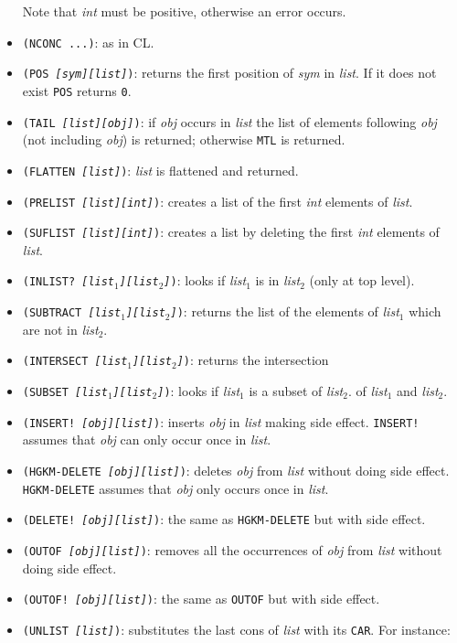 \begin{itemize}
        Note that {\it int} must be positive, otherwise an error occurs.
    \item {\tt (NCONC ...)}:
         as in CL.
    \item {\tt  (POS {\it [sym][list]})}:
        returns the first position of {\it sym} in {\it list}.
        If it does not exist {\tt POS} returns {\tt 0}.
    \item {\tt  (TAIL {\it [list][obj]})}:
        if {\it obj} occurs in {\it list} the list of elements following
        {\it obj} (not including {\it obj}) is returned; otherwise {\tt MTL}
        is returned. 
    \item {\tt  (FLATTEN {\it [list]})}:
        {\it list} is flattened and returned.
    \item {\tt  (PRELIST {\it [list][int]})}:
        creates a list of the first {\it int} elements of {\it list}.
    \item {\tt  (SUFLIST {\it [list][int]})}:
        creates a list by deleting the first {\it int} elements of {\it list}.
    \item {\tt  (INLIST? {\it [list$_1$][list$_2$]})}:
        looks if {\it list$_1$} is in {\it list$_2$} (only at top level).
    \item {\tt  (SUBTRACT {\it [list$_1$][list$_2$]})}:
        returns the list of the elements of {\it list$_1$} which are not in
        {\it list$_2$}. 
    \item {\tt  (INTERSECT {\it [list$_1$][list$_2$]})}:
         returns the intersection
    \item {\tt (SUBSET {\it [list$_1$][list$_2$]})}:
        looks if {\it list$_1$} is a subset of {\it list$_2$}.
        of {\it list$_1$} and {\it list$_2$}.
    \item {\tt  (INSERT! {\it [obj][list]})}:
        inserts {\it obj} in {\it list} making side effect.
        {\tt INSERT!} assumes that {\it obj} can only occur once in {\it
        list}. 
    \item {\tt  (HGKM-DELETE {\it [obj][list]})}:
        deletes {\it obj} from {\it list} without doing side effect.
        {\tt HGKM-DELETE} assumes that {\it obj} only occurs once in {\it
        list}. 
    \item {\tt  (DELETE! {\it [obj][list]})}:
         the same as {\tt HGKM-DELETE} but with side effect.
    \item {\tt  (OUTOF {\it [obj][list]})}:
        removes all the occurrences of {\it obj} from {\it list} without
        doing side effect.
    \item {\tt  (OUTOF! {\it [obj][list]})}:
         the same as {\tt OUTOF} but with side effect.
    \item {\tt  (UNLIST {\it [list]})}:
        substitutes the last cons of {\it list} with its {\tt CAR}.
        For instance:


\end{itemize}
